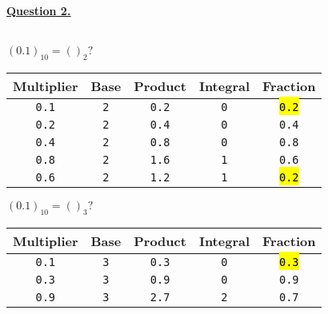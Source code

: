 \documentclass[12pt]{article}
\begin{document}
\newpage
\noindent \hyperlink{toc}{\hypertarget{2}{\LARGE \underline{\textbf{Question 2.}}}}\\\\
\begin{minipage}[t]{0.5\textwidth}
	$(0.1)_{10} = ()_2?$
	\begin{center}
		\begin{tabular}{|c|c|c|c|c|}
			\hline \cellcolor{gray!25}Multiplier &
			\cellcolor{gray!25}Base              &
			\cellcolor{gray!25}Product           &
			\cellcolor{gray!25}Integral          &
			\cellcolor{gray!25}Fraction                                                                       \\
			\hline\hline
			\texttt{0.1}                         & \texttt{2} & \texttt{0.2} & \texttt{0} & \hl{\texttt{0.2}} \\\hline
			\texttt{0.2}                         & \texttt{2} & \texttt{0.4} & \texttt{0} & \texttt{0.4}      \\\hline
			\texttt{0.4}                         & \texttt{2} & \texttt{0.8} & \texttt{0} & \texttt{0.8}      \\\hline
			\texttt{0.8}                         & \texttt{2} & \texttt{1.6} & \texttt{1} & \texttt{0.6}      \\\hline
			\texttt{0.6}                         & \texttt{2} & \texttt{1.2} & \texttt{1} & \hl{\texttt{0.2}} \\\hline
		\end{tabular}
	\end{center}
	$(0.1)_{10} = ()_3?$
	\begin{center}
		\begin{tabular}{|c|c|c|c|c|}
			\hline \cellcolor{gray!25}Multiplier &
			\cellcolor{gray!25}Base              &
			\cellcolor{gray!25}Product           &
			\cellcolor{gray!25}Integral          &
			\cellcolor{gray!25}Fraction                                                                       \\
			\hline\hline
			\texttt{0.1}                         & \texttt{3} & \texttt{0.3} & \texttt{0} & \hl{\texttt{0.3}} \\\hline
			\texttt{0.3}                         & \texttt{3} & \texttt{0.9} & \texttt{0} & \texttt{0.9}      \\\hline
			\texttt{0.9}                         & \texttt{3} & \texttt{2.7} & \texttt{2} & \texttt{0.7}      \\\hline

\end{tabular}
\end{center}
\end{minipage}
\end{document}

